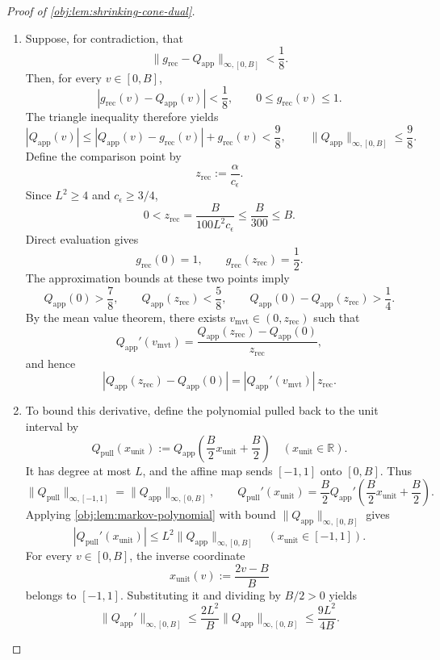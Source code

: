 \begin{proof}[Proof of \cref{obj:lem:shrinking-cone-dual}]
\begin{enumerate}
\item Suppose, for contradiction, that
\[
\|g_{\mathrm{rec}}-Q_{\mathrm{app}}\|_{\infty,[0,B]}<\frac18.
\]
Then, for every \(v\in[0,B]\),
\[
|g_{\mathrm{rec}}(v)-Q_{\mathrm{app}}(v)|<\frac18,
\qquad
0\le g_{\mathrm{rec}}(v)\le1.
\]
The triangle inequality therefore yields
\[
|Q_{\mathrm{app}}(v)|
\le
|Q_{\mathrm{app}}(v)-g_{\mathrm{rec}}(v)|
+g_{\mathrm{rec}}(v)
<\frac98,
\qquad
\|Q_{\mathrm{app}}\|_{\infty,[0,B]}\le\frac98.
\]
Define the comparison point by
\[
z_{\mathrm{rec}}:=\frac{\alpha}{c_\epsilon}.
\]
Since \(L^2\ge4\) and \(c_\epsilon\ge3/4\),
\[
0<z_{\mathrm{rec}}
=
\frac{B}{100L^2c_\epsilon}
\le\frac{B}{300}\le B.
\]
Direct evaluation gives
\[
g_{\mathrm{rec}}(0)=1,
\qquad
g_{\mathrm{rec}}(z_{\mathrm{rec}})=\frac12.
\]
The approximation bounds at these two points imply
\[
Q_{\mathrm{app}}(0)>\frac78,
\qquad
Q_{\mathrm{app}}(z_{\mathrm{rec}})<\frac58,
\qquad
Q_{\mathrm{app}}(0)-Q_{\mathrm{app}}(z_{\mathrm{rec}})>\frac14.
\]
By the mean value theorem, there exists \(v_{\mathrm{mvt}}\in(0,z_{\mathrm{rec}})\) such that
\[
Q_{\mathrm{app}}'(v_{\mathrm{mvt}})
=
\frac{Q_{\mathrm{app}}(z_{\mathrm{rec}})-Q_{\mathrm{app}}(0)}
{z_{\mathrm{rec}}},
\]
and hence
\[
|Q_{\mathrm{app}}(z_{\mathrm{rec}})-Q_{\mathrm{app}}(0)|
=
|Q_{\mathrm{app}}'(v_{\mathrm{mvt}})|\,z_{\mathrm{rec}}.
\]

\item To bound this derivative, define the polynomial pulled back to the unit interval by
\[
Q_{\mathrm{pull}}(x_{\mathrm{unit}})
:=
Q_{\mathrm{app}}\!\left(\frac B2x_{\mathrm{unit}}+\frac B2\right)
\quad (x_{\mathrm{unit}}\in\mathbb R).
\]
It has degree at most \(L\), and the affine map sends \([-1,1]\) onto \([0,B]\). Thus
\[
\|Q_{\mathrm{pull}}\|_{\infty,[-1,1]}
=
\|Q_{\mathrm{app}}\|_{\infty,[0,B]},
\qquad
Q_{\mathrm{pull}}'(x_{\mathrm{unit}})
=
\frac B2
Q_{\mathrm{app}}'\!\left(\frac B2x_{\mathrm{unit}}+\frac B2\right).
\]
Applying \cref{obj:lem:markov-polynomial} with bound
\(\|Q_{\mathrm{app}}\|_{\infty,[0,B]}\) gives
\[
|Q_{\mathrm{pull}}'(x_{\mathrm{unit}})|
\le
L^2\|Q_{\mathrm{app}}\|_{\infty,[0,B]}
\quad (x_{\mathrm{unit}}\in[-1,1]).
\]
For every \(v\in[0,B]\), the inverse coordinate
\[
x_{\mathrm{unit}}(v):=\frac{2v-B}{B}
\]
belongs to \([-1,1]\). Substituting it and dividing by \(B/2>0\) yields
\[
\|Q_{\mathrm{app}}'\|_{\infty,[0,B]}
\le
\frac{2L^2}{B}\|Q_{\mathrm{app}}\|_{\infty,[0,B]}
\le
\frac{9L^2}{4B}.
\]


\end{enumerate}
\end{proof}
